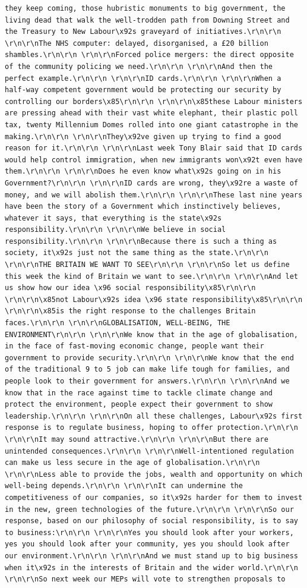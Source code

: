 \documentclass[
  letterpaper,
  DIV=11,
  numbers=noendperiod]{scrreprt}
\begin{document}
\begin{verbatim}
they keep coming, those hubristic monuments to big government, the living dead that walk the well-trodden path from Downing Street and the Treasury to New Labour\x92s graveyard of initiatives.\r\n\r\n \r\n\r\nThe NHS computer: delayed, disorganised, a £20 billion shambles.\r\n\r\n \r\n\r\nForced police mergers: the direct opposite of the community policing we need.\r\n\r\n \r\n\r\nAnd then the perfect example.\r\n\r\n \r\n\r\nID cards.\r\n\r\n \r\n\r\nWhen a half-way competent government would be protecting our security by controlling our borders\x85\r\n\r\n \r\n\r\n\x85these Labour ministers are pressing ahead with their vast white elephant, their plastic poll tax, twenty Millennium Domes rolled into one giant catastrophe in the making.\r\n\r\n \r\n\r\nThey\x92ve given up trying to find a good reason for it.\r\n\r\n \r\n\r\nLast week Tony Blair said that ID cards would help control immigration, when new immigrants won\x92t even have them.\r\n\r\n \r\n\r\nDoes he even know what\x92s going on in his Government?\r\n\r\n \r\n\r\nID cards are wrong, they\x92re a waste of money, and we will abolish them.\r\n\r\n \r\n\r\nThese last nine years have been the story of a Government which instinctively believes, whatever it says, that everything is the state\x92s responsibility.\r\n\r\n \r\n\r\nWe believe in social responsibility.\r\n\r\n \r\n\r\nBecause there is such a thing as society, it\x92s just not the same thing as the state.\r\n\r\n \r\n\r\nTHE BRITAIN WE WANT TO SEE\r\n\r\n \r\n\r\nSo let us define this week the kind of Britain we want to see.\r\n\r\n \r\n\r\nAnd let us show how our idea \x96 social responsibility\x85\r\n\r\n \r\n\r\n\x85not Labour\x92s idea \x96 state responsibility\x85\r\n\r\n \r\n\r\n\x85is the right response to the challenges Britain faces.\r\n\r\n \r\n\r\nGLOBALISATION, WELL-BEING, THE ENVIRONMENT\r\n\r\n \r\n\r\nWe know that in the age of globalisation, in the face of fast-moving economic change, people want their government to provide security.\r\n\r\n \r\n\r\nWe know that the end of the traditional 9 to 5 job can make life tough for families, and people look to their government for answers.\r\n\r\n \r\n\r\nAnd we know that in the race against time to tackle climate change and protect the environment, people expect their government to show leadership.\r\n\r\n \r\n\r\nOn all these challenges, Labour\x92s first response is to regulate business, hoping to offer protection.\r\n\r\n \r\n\r\nIt may sound attractive.\r\n\r\n \r\n\r\nBut there are unintended consequences.\r\n\r\n \r\n\r\nWell-intentioned regulation can make us less secure in the age of globalisation.\r\n\r\n \r\n\r\nLess able to provide the jobs, wealth and opportunity on which well-being depends.\r\n\r\n \r\n\r\nIt can undermine the competitiveness of our companies, so it\x92s harder for them to invest in the new, green technologies of the future.\r\n\r\n \r\n\r\nSo our response, based on our philosophy of social responsibility, is to say to business:\r\n\r\n \r\n\r\nYes you should look after your workers, yes you should look after your community, yes you should look after our environment.\r\n\r\n \r\n\r\nAnd we must stand up to big business when it\x92s in the interests of Britain and the wider world.\r\n\r\n \r\n\r\nSo next week our MEPs will vote to strengthen proposals to 
\end{verbatim}
\end{document}

